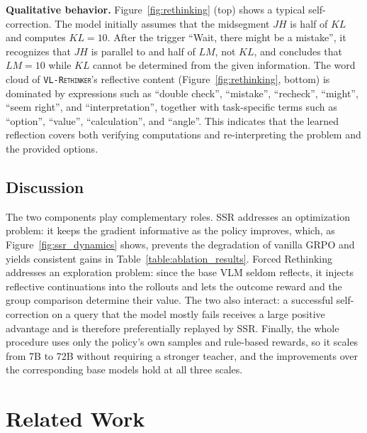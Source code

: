 \documentclass{article}
\newcommand{\model}{\texttt{\textsc{VL-Rethinker}}\xspace}
\begin{document}
\textbf{Qualitative behavior.} Figure~\ref{fig:rethinking} (top) shows a typical self-correction. The model initially assumes that the midsegment $JH$ is half of $KL$ and computes $KL=10$. After the trigger ``Wait, there might be a mistake'', it recognizes that $JH$ is parallel to and half of $LM$, not $KL$, and concludes that $LM=10$ while $KL$ cannot be determined from the given information. The word cloud of \model's reflective content (Figure~\ref{fig:rethinking}, bottom) is dominated by expressions such as ``double check'', ``mistake'', ``recheck'', ``might'', ``seem right'', and ``interpretation'', together with task-specific terms such as ``option'', ``value'', ``calculation'', and ``angle''. This indicates that the learned reflection covers both verifying computations and re-interpreting the problem and the provided options.

\subsection{Discussion}

The two components play complementary roles. SSR addresses an optimization problem: it keeps the gradient informative as the policy improves, which, as Figure~\ref{fig:ssr_dynamics} shows, prevents the degradation of vanilla GRPO and yields consistent gains in Table~\ref{table:ablation_results}. Forced Rethinking addresses an exploration problem: since the base VLM seldom reflects, it injects reflective continuations into the rollouts and lets the outcome reward and the group comparison determine their value. The two also interact: a successful self-correction on a query that the model mostly fails receives a large positive advantage and is therefore preferentially replayed by SSR. Finally, the whole procedure uses only the policy's own samples and rule-based rewards, so it scales from 7B to 72B without requiring a stronger teacher, and the improvements over the corresponding base models hold at all three scales.

\section{Related Work}
\label{sec:related}
\end{document}
